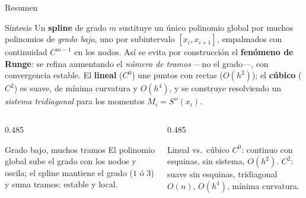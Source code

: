 \documentclass[aspectratio=169,10pt]{beamer}
\begin{document}
\begin{frame}{Resumen}
\begin{cardidea}{Síntesis}{\faLightbulb}
Un \textbf{spline} de grado $m$ sustituye un único polinomio global por muchos polinomios de \emph{grado bajo}, uno por subintervalo $[x_i,x_{i+1}]$, empalmados con continuidad $C^{m-1}$ en los nodos. Así se evita por construcción el \textbf{fenómeno de Runge}: se refina aumentando el \emph{número de tramos} —no el grado—, con convergencia estable. El \textbf{lineal} ($C^0$) une puntos con rectas ($O(h^2)$); el \textbf{cúbico} ($C^2$) es suave, de mínima curvatura y $O(h^4)$, y se construye resolviendo un \emph{sistema tridiagonal} para los momentos $M_i=S''(x_i)$.
\end{cardidea}
\vspace{2mm}
\begin{columns}[T]
\begin{column}{0.485\textwidth}
\begin{cardgear}{Grado bajo, muchos tramos}{\faCogs}
El polinomio global sube el grado con los nodos y oscila; el spline mantiene el grado ($1$ ó $3$) y suma tramos: estable y local.
\end{cardgear}
\end{column}
\begin{column}{0.485\textwidth}
\begin{cardgear}{Lineal vs.\ cúbico}{\faCogs}
$C^0$: continuo con esquinas, sin sistema, $O(h^2)$. $C^2$: suave sin esquinas, tridiagonal $O(n)$, $O(h^4)$, mínima curvatura.
\end{cardgear}
\end{column}
\end{columns}
\end{frame}
\end{document}
